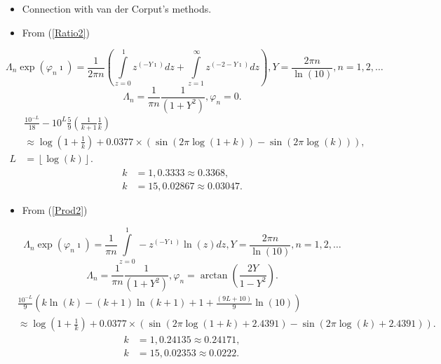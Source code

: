\documentclass[titlepage,fleqn]{article}%
\begin{document}
\begin{itemize}
\item Connection with van der Corput's methods.

\item From (\ref{Ratio2})
\end{itemize}

%

\[
\Lambda_{n}\exp(\varphi_{n}\imath)=\frac{1}{2\pi n}\left(
{\displaystyle\int\limits_{z=0}^{\ 1}}
z^{(-Y\imath)}dz+%
{\displaystyle\int\limits_{z=1}^{\ \infty}}
z^{(-2-Y\imath)}dz\right)  ,Y=\frac{2\pi n}{\ln(10)},n=1,2,\ldots
\]%
\[
\Lambda_{n}=\frac{1}{\pi n}\frac{1}{(1+Y^{2})},\varphi_{n}=0.
\]%
\begin{align}
&  \frac{10^{-L}}{18}-10^{L}\frac{5}{9}\left(  \frac{1}{k+1}\frac{1}{k}\right)
\label{Ratio3}\\
&  \approx\log\left(  1+\frac{1}{k}\right)  +0.0377\times\left(  \sin\left(
2\pi\log(1+k)\right)  -\sin\left(  2\pi\log(k)\right)  \right)  ,\nonumber\\
L  &  =\left\lfloor \log(k)\right\rfloor .\nonumber
\end{align}%
\begin{align*}
k  &  =1,0.3333\approx0.3368,\\
k  &  =15,0.02867\approx0.03047.
\end{align*}


\begin{itemize}
\item From (\ref{Prod2})
\end{itemize}

%

\[
\Lambda_{n}\exp(\varphi_{n}\imath)=\frac{1}{\pi n}%
{\displaystyle\int\limits_{z=0}^{1}}
-z^{(-Y\imath)}\ln(z)dz,Y=\frac{2\pi n}{\ln(10)},n=1,2,\ldots
\]%
\[
\Lambda_{n}=\frac{1}{\pi n}\frac{1}{(1+Y^{2})},\varphi_{n}=\arctan\left(
\frac{2Y}{1-Y^{2}}\right)  .
\]%
\begin{align}
&  \frac{10^{-L}}{9}\left(  k\ln(k)-(k+1)\ln(k+1)+1+\frac{(9L+10)}{9}%
\ln(10)\right) \label{Prod3}\\
&  \approx\log\left(  1+\frac{1}{k}\right)  +0.0377\times\left(  \sin\left(
2\pi\log(1+k)+2.4391\right)  -\sin\left(  2\pi\log(k)+2.4391\right)  \right)
.\nonumber
\end{align}%
\begin{align*}
k  &  =1,0.24135\approx0.24171,\\
k  &  =15,0.02353\approx0.0222.
\end{align*}
\end{document}
